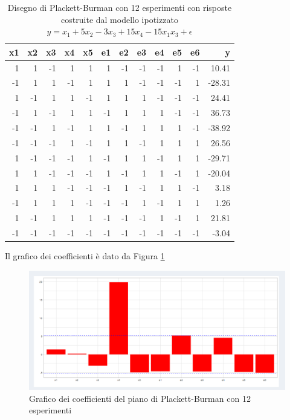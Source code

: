 \documentclass[
  11pt,
]{book}
\begin{document}
\begin{table}

\caption{\label{tab:pb12}Disegno di Plackett-Burman con 12 esperimenti con risposte costruite dal modello ipotizzato
            $y=x_1+5x_2-3x_3+15x_4-15x_1x_3+\epsilon$ }
\centering
\begin{tabular}[t]{r|r|r|r|r|r|r|r|r|r|r|r}
\hline
x1 & x2 & x3 & x4 & x5 & e1 & e2 & e3 & e4 & e5 & e6 & y\\
\hline
1 & 1 & -1 & 1 & 1 & 1 & -1 & -1 & -1 & 1 & -1 & 10.41\\
\hline
-1 & 1 & 1 & -1 & 1 & 1 & 1 & -1 & -1 & -1 & 1 & -28.31\\
\hline
1 & -1 & 1 & 1 & -1 & 1 & 1 & 1 & -1 & -1 & -1 & 24.41\\
\hline
-1 & 1 & -1 & 1 & 1 & -1 & 1 & 1 & 1 & -1 & -1 & 36.73\\
\hline
-1 & -1 & 1 & -1 & 1 & 1 & -1 & 1 & 1 & 1 & -1 & -38.92\\
\hline
-1 & -1 & -1 & 1 & -1 & 1 & 1 & -1 & 1 & 1 & 1 & 26.56\\
\hline
1 & -1 & -1 & -1 & 1 & -1 & 1 & 1 & -1 & 1 & 1 & -29.71\\
\hline
1 & 1 & -1 & -1 & -1 & 1 & -1 & 1 & 1 & -1 & 1 & -20.04\\
\hline
1 & 1 & 1 & -1 & -1 & -1 & 1 & -1 & 1 & 1 & -1 & 3.18\\
\hline
-1 & 1 & 1 & 1 & -1 & -1 & -1 & 1 & -1 & 1 & 1 & 1.26\\
\hline
1 & -1 & 1 & 1 & 1 & -1 & -1 & -1 & 1 & -1 & 1 & 21.81\\
\hline
-1 & -1 & -1 & -1 & -1 & -1 & -1 & -1 & -1 & -1 & -1 & -3.04\\
\hline
\end{tabular}
\end{table}

Il grafico dei coefficienti è dato da Figura \ref{fig:pb8}

\begin{figure}[ht]

{\centering \includegraphics[width=1\linewidth]{Immagini/PB/08_coeff12} 

}

\caption{Grafico dei coefficienti del piano di Plackett-Burman con 12 esperimenti}\label{fig:pb8}
\end{figure}
\end{document}

